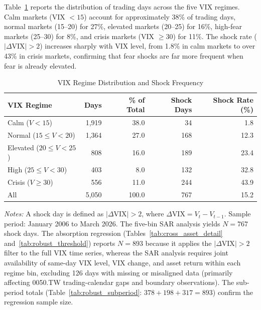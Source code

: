 \documentclass[12pt,a4paper]{article}
\begin{document}
Table~\ref{tab:regime_dist} reports the distribution of trading days across the five VIX regimes. Calm markets (VIX $< 15$) account for approximately 38\% of trading days, normal markets (15--20) for 27\%, elevated markets (20--25) for 16\%, high-fear markets (25--30) for 8\%, and crisis markets (VIX $\geq 30$) for 11\%. The shock rate ($|\Delta\text{VIX}| > 2$) increases sharply with VIX level, from 1.8\% in calm markets to over 43\% in crisis markets, confirming that fear shocks are far more frequent when fear is already elevated.

\begin{table}[H]
\centering
\caption{VIX Regime Distribution and Shock Frequency}
\label{tab:regime_dist}
\begin{threeparttable}
\begin{tabular}{lrrrr}
\toprule
VIX Regime & Days & \% of Total & Shock Days & Shock Rate (\%) \\
\midrule
Calm ($V < 15$)              & 1,919 & 38.0 &  34 &  1.8 \\
Normal ($15 \leq V < 20$)    & 1,364 & 27.0 & 168 & 12.3 \\
Elevated ($20 \leq V < 25$)  &   808 & 16.0 & 189 & 23.4 \\
High ($25 \leq V < 30$)      &   403 &  8.0 & 132 & 32.8 \\
Crisis ($V \geq 30$)         &   556 & 11.0 & 244 & 43.9 \\
\addlinespace
All                           & 5,050 & 100.0 & 767 & 15.2 \\
\bottomrule
\end{tabular}
\begin{tablenotes}
\small
\item \textit{Notes:} A shock day is defined as $|\Delta\text{VIX}| > 2$, where $\Delta\text{VIX} = V_t - V_{t-1}$. Sample period: January 2006 to March 2026. The five-bin SAR analysis yields $N = 767$ shock days. The absorption regression (Tables~\ref{tab:cross_asset_detail} and~\ref{tab:robust_threshold}) reports $N = 893$ because it applies the $|\Delta\text{VIX}| > 2$ filter to the full VIX time series, whereas the SAR analysis requires joint availability of same-day VIX level, VIX change, and asset return within each regime bin, excluding 126 days with missing or misaligned data (primarily affecting 0050.TW trading-calendar gaps and boundary observations). The sub-period totals (Table~\ref{tab:robust_subperiod}: $378 + 198 + 317 = 893$) confirm the regression sample size.
\end{tablenotes}
\end{threeparttable}
\end{table}
\end{document}

